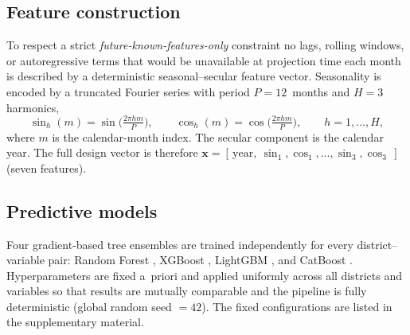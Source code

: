 \documentclass[pdflatex,sn-basic,lineno]{sn-jnl}
\begin{document}
\subsection{Feature construction}\label{sec:features}
To respect a strict \emph{future-known-features-only} constraint no lags,
rolling windows, or autoregressive terms that would be unavailable at projection
time each month is described by a deterministic seasonal--secular feature
vector. Seasonality is encoded by a truncated Fourier series with period
$P=12$~months and $H=3$ harmonics,
\begin{equation}
\sin_{h}(m)=\sin\!\Big(\tfrac{2\pi h m}{P}\Big),\qquad
\cos_{h}(m)=\cos\!\Big(\tfrac{2\pi h m}{P}\Big),\qquad h=1,\dots,H,
\end{equation}
where $m$ is the calendar-month index. The secular component is the calendar
year. The full design vector is therefore
$\mathbf{x}=[\,\mathrm{year},\ \sin_{1},\cos_{1},\dots,\sin_{3},\cos_{3}\,]$
(seven features).

\subsection{Predictive models}\label{sec:models}
Four gradient-based tree ensembles are trained independently for every
district--variable pair: Random Forest \citep{Breiman2001}, XGBoost
\citep{chen2016xgboost}, LightGBM \citep{ke2017lightgbm}, and CatBoost
\citep{prokhorenkova2018catboost}. Hyperparameters are fixed a~priori and applied
uniformly across all districts and variables so that results are mutually
comparable and the pipeline is fully deterministic (global random seed $=42$).
The fixed configurations are listed in the supplementary material.
\end{document}
